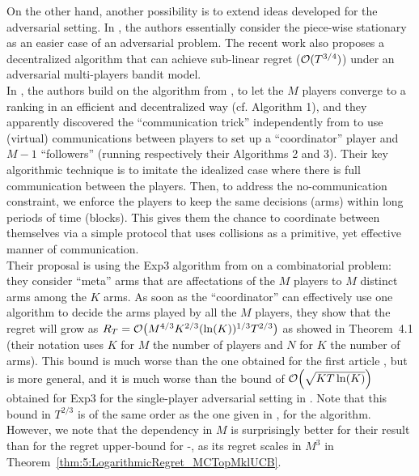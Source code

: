 On the other hand, another possibility is to extend ideas developed for the adversarial setting.
In \cite{AlaturLevyKrause19}, the authors essentially consider the piece-wise stationary as an easier case of an adversarial problem.
The recent work \cite{bande2019adversarial} also proposes a decentralized algorithm that can achieve sub-linear regret ($\mathcal{O}(T^{3/4})$) under an adversarial multi-players bandit model.
\\
\indent
In \cite{AlaturLevyKrause19}, the authors build on the \MusicalChair{} algorithm from \cite{Rosenski16}, to let the $M$ players converge to a ranking in an efficient and decentralized way (cf. Algorithm 1), and they apparently discovered the ``communication trick'' independently from \cite{BoursierPerchet18} to use (virtual) communications between players to set up a ``coordinator'' player and $M-1$ ``followers'' (running respectively their Algorithms 2 and 3).
%
Their key algorithmic technique is to imitate the idealized case where there is full communication between the players. Then, to address the no-communication constraint, we enforce the players to keep the same decisions (arms) within long periods of time (blocks). This gives them the chance to coordinate between themselves via a simple protocol that uses collisions as a primitive, yet effective manner of communication.\\
%
\indent
Their proposal is using the Exp3 algorithm from \cite{Auer02NonStochastic} on a combinatorial problem: they consider ``meta'' arms that are affectations of the $M$ players to $M$ distinct arms among the $K$ arms.
As soon as the ``coordinator'' can effectively use one algorithm to decide the arms played by all the $M$ players, they show that the regret will grow as $R_T = \mathop{}\mathopen{}\mathcal{O}\mathopen{}\left(M^{4/3} K^{2/3} (\ln(K))^{1/3} T^{2/3}\right)$ as showed in Theorem~4.1
(their notation uses $K$ for $M$ the number of players and $N$ for $K$ the number of arms).
This bound is much worse than the one obtained for the first article \cite{WeiSrivastava18Distributed}, but is more general, and it is much worse than the bound of $\mathop{}\mathopen{}\mathcal{O}\mathopen{}\left(\sqrt{K T \ln(K)}\right)$ obtained for Exp3 for the single-player adversarial setting in \cite{Auer02NonStochastic}.
Note that this bound in $T^{2/3}$ is of the same order as the one given in \cite{Avner15}, for the \MEGA{} algorithm.
However, we note that the dependency in $M$ is surprisingly better for their result than for the regret upper-bound for \MCTopM-\klUCB, as its regret scales in $M^3$ in Theorem~\ref{thm:5:LogarithmicRegret_MCTopMklUCB}.\\

